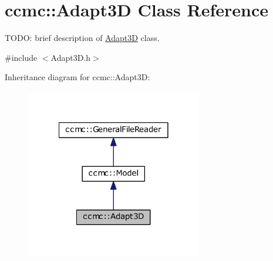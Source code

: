\hypertarget{classccmc_1_1_adapt3_d}{\section{ccmc\-:\-:Adapt3\-D Class Reference}
\label{classccmc_1_1_adapt3_d}
}


T\-O\-D\-O\-: brief description of \hyperlink{classccmc_1_1_adapt3_d}{Adapt3\-D} class.  




{\ttfamily \#include $<$Adapt3\-D.\-h$>$}



Inheritance diagram for ccmc\-:\-:Adapt3\-D\-:
\nopagebreak
\begin{figure}[H]
\begin{center}
\leavevmode
\includegraphics[width=218pt]{classccmc_1_1_adapt3_d__inherit__graph}
\end{center}
\end{figure}


